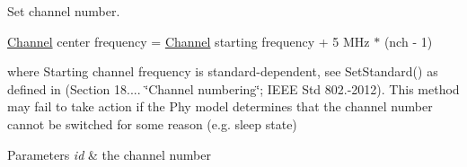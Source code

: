 Set channel number. 

\hyperlink{classns3_1_1Channel}{Channel} center frequency = \hyperlink{classns3_1_1Channel}{Channel} starting frequency + 5 M\+Hz $\ast$ (nch -\/ 1)

where Starting channel frequency is standard-\/dependent, see Set\+Standard() as defined in (Section 18.... \char`\"{}\+Channel numbering\char`\"{}; I\+E\+EE Std 802.-\/2012). This method may fail to take action if the Phy model determines that the channel number cannot be switched for some reason (e.\+g. sleep state)


\begin{DoxyParams}{Parameters}
{\em id} & the channel number \\
\hline
\end{DoxyParams}

